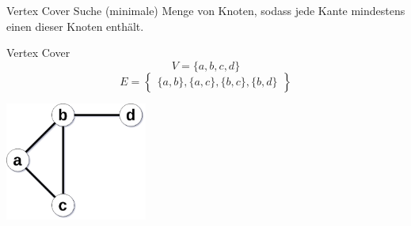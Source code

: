 \documentclass[xcolor=dvipsnames]{beamer}
\begin{document}
\begin{frame}{\FrameName}
\begin{block}{Vertex Cover}
	\Gap
	Suche (minimale) Menge von Knoten, sodass jede Kante mindestens einen dieser Knoten enthält.\linebreak
	$ $\linebreak
	
\end{block}
\end{frame}

\newcommand{\ExampleGraphV}{V = \{a,b,c,d\}}
\newcommand{\ExampleGraphE}{E = 
	\begin{Bmatrix}
		\{a,b\},
		\{a,c\},
		\{b,c\},
		\{b,d\}
	\end{Bmatrix}
}

\begin{frame}{\FrameName}
\begin{block}{Vertex Cover}
	\Gap
	$$\ExampleGraphV$$ 
	$$\ExampleGraphE$$
	\begin{center}
		\includegraphics[width=0.35\textwidth]{Images/VertexCover/blank}
	\end{center}
\end{block}
\end{frame}
\end{document}

